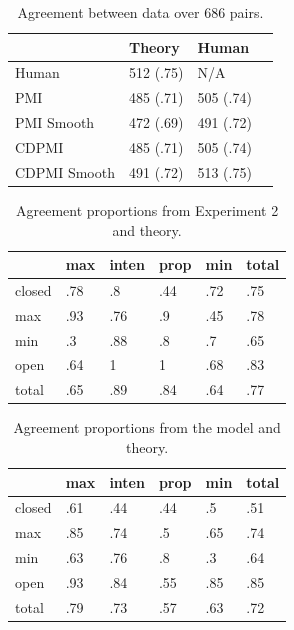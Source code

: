 \documentclass[11pt]{article}
\begin{document}
\begin{table}[h]
\begin{center}
\begin{tabular}{|l|l|l|l|}
\hline & \bf Theory & \bf Human \\ \hline
Human & 512 (.75) & N/A \\ \hline
PMI & 485 (.71) & 505 (.74) \\ \hline
PMI Smooth & 472 (.69) & 491 (.72) \\ \hline
CDPMI & 485 (.71) & 505 (.74) \\ \hline
CDPMI Smooth & 491 (.72) & 513 (.75) \\ \hline
\end{tabular}
\end{center}
\caption{\label{tab:agreement} Agreement between data over 686 pairs. }
\end{table}
\begin{table}[h]
\begin{center}
\begin{tabular}{| l | l | l | l | l | l | }
\hline
& max & inten & prop & min & total \\ \hline
closed & .78 & .8 & .44 & .72 & .75 \\ \hline
max & .93 & .76 & .9 & .45 & .78 \\ \hline
min & .3 & .88 & .8 & .7 & .65 \\ \hline
open & .64 & 1 & 1 & .68 & .83 \\ \hline
total & .65 & .89 & .84 & .64 & .77 \\ \hline
\end{tabular}
\end{center}
\caption{\label{tab:rating-agreement} Agreement proportions from Experiment 2 and theory. }
\end{table}
\begin{table}[h]
\begin{center}
\begin{tabular}{| l | l | l | l | l | l | }
\hline
& max & inten & prop & min & total \\ \hline 
closed & .61 & .44 & .44 & .5 & .51 \\ \hline
max & .85 & .74 & .5 & .65 & .74 \\ \hline
min & .63 & .76 & .8 & .3 & .64 \\ \hline
open & .93 & .84 & .55 & .85 & .85 \\ \hline
total & .79 & .73 & .57 & .63 & .72 \\ \hline
\end{tabular}
\end{center}
\caption{\label{tab:model-agreement} Agreement proportions from the model and theory. }
\end{table}
\end{document}
